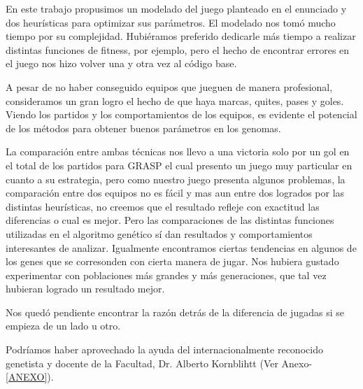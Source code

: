 En este trabajo propusimos un modelado del juego planteado en el enunciado y dos heurísticas para optimizar sus parámetros.
El modelado nos tomó mucho tiempo por su complejidad.
Hubiéramos preferido dedicarle más tiempo a realizar distintas funciones de fitness, por ejemplo, pero el hecho de encontrar
errores en el juego nos hizo volver una y otra vez al código base.

A pesar de no haber conseguido equipos que jueguen de manera profesional, consideramos un gran logro el hecho
 de que haya marcas, quites, pases y goles.
Viendo los partidos y los comportamientos de los equipos, es evidente el potencial de los métodos para obtener
 buenos parámetros en los genomas.

La comparación entre ambas técnicas nos llevo a una victoria solo por un gol en el total de los partidos para GRASP
el cual presento un juego muy particular en cuanto a su estrategia, pero como nuestro juego presenta algunos problemas,
 la comparación entre dos equipos no es fácil y mas aun entre dos logrados por las distintas heurísticas, no creemos que
el resultado refleje con exactitud las diferencias o cual es mejor. Pero las comparaciones de las distintas funciones utilizadas
 en el algoritmo genético sí dan resultados y comportamientos interesantes de analizar.
Igualmente encontramos ciertas tendencias en algunos de los genes que se corresonden con cierta manera de jugar.
Nos hubiera gustado experimentar con poblaciones más grandes y más generaciones, que tal vez hubieran logrado un resultado mejor.

Nos quedó pendiente encontrar la razón detrás de la diferencia de jugadas si se empieza de un lado u otro.

Podríamos haber aprovechado la ayuda del internacionalmente reconocido genetista y docente de la Facultad, Dr. Alberto Kornblihtt (Ver Anexo-\ref{ANEXO}).
















